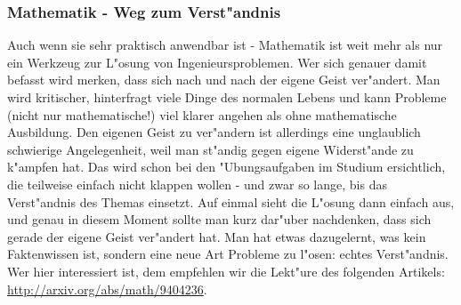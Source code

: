\subsubsection{Mathematik - Weg zum Verst"andnis}
Auch wenn sie sehr praktisch anwendbar ist - Mathematik ist weit mehr als nur ein Werkzeug zur L"osung von Ingenieursproblemen. Wer sich genauer damit befasst wird merken, dass sich nach und nach der eigene Geist ver"andert. Man wird kritischer, hinterfragt viele Dinge des normalen Lebens und kann Probleme (nicht nur mathematische!) viel klarer angehen als ohne mathematische Ausbildung. Den eigenen Geist zu ver"andern ist allerdings eine unglaublich schwierige Angelegenheit, weil man st"andig gegen eigene Widerst"ande zu k"ampfen hat. Das wird schon bei den "Ubungsaufgaben im Studium ersichtlich, die teilweise einfach nicht klappen wollen - und zwar so lange, bis das Verst"andnis des Themas einsetzt. Auf einmal sieht die L"osung dann einfach aus, und genau in diesem Moment sollte man kurz dar"uber nachdenken, dass sich gerade der eigene Geist ver"andert hat. Man hat etwas dazugelernt, was kein Faktenwissen ist, sondern eine neue Art Probleme zu l"osen: echtes Verst"andnis.
Wer hier interessiert ist, dem empfehlen wir die Lekt"ure des folgenden Artikels: \url{http://arxiv.org/abs/math/9404236}.